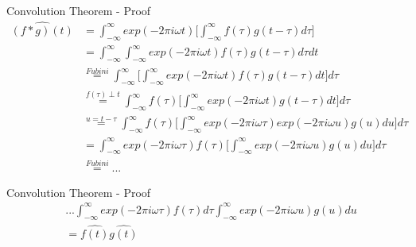  \begin{vbframe}{Convolution Theorem - Proof}
     \begin{equation*}
         \begin{split}
             \widehat{(f \ast g)(t)} &= \int_{-\infty}^\infty exp(-2 \pi i \omega t) \Big[ \int_{-\infty}^\infty f(\tau) g(t-\tau)d\tau \Big] \\
             & = \int_{-\infty}^\infty \int_{-\infty}^\infty exp(-2 \pi i \omega t) f(\tau)g(t-\tau)d\tau dt \\
             & \overset{Fubini}{=} \int_{-\infty}^\infty \Big[ \int_{-\infty}^\infty exp(-2 \pi i \omega t) f(\tau) g(t-\tau ) dt  \Big] d\tau \\
             & \overset{f(\tau) \perp t}{=} \int_{-\infty}^\infty f(\tau) \Big[ \int_{-\infty}^\infty exp(-2 \pi i \omega t) g(t-\tau) dt \Big]d \tau \\
             & \overset{u = t - \tau}{=} \int_{-\infty}^\infty f(\tau) \Big[ \int_{-\infty}^\infty exp(-2\pi i \omega \tau) exp(-2 \pi i \omega u) g(u) du \Big] d\tau \\
             & = \int_{-\infty}^\infty exp(-2 \pi i \omega \tau) f(\tau) \Big[ \int_{-\infty}^\infty exp(-2 \pi i \omega u) g(u) du \Big] d \tau \\
             & \overset{Fubini}{=} ...
         \end{split}
     \end{equation*}
 \end{vbframe}
 
 \begin{vbframe}{Convolution Theorem - Proof}
     \begin{equation*}
         \begin{split}
             &... \int_{-\infty}^\infty exp(-2 \pi i \omega \tau) f(\tau) d\tau \int_{-\infty}^\infty exp(-2 \pi i \omega u) g(u) du \\
             &= \hat{f(t)}\hat{g(t)}
         \end{split}
     \end{equation*}
 \end{vbframe}


